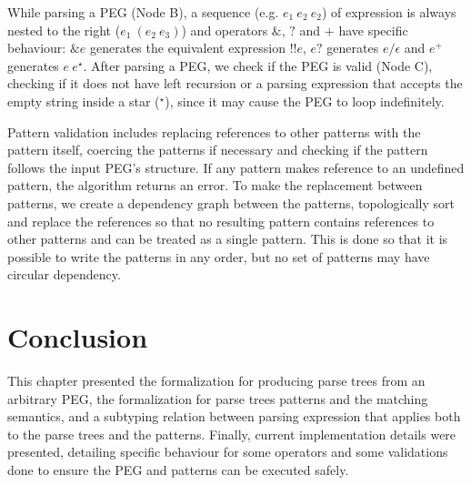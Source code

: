 While parsing a PEG (Node B), a sequence (e.g. \(e_1\:e_2\:e_2\)) of expression 
is always nested to the right (\(e_1\:(e_2\:e_3)\)) and operators \(\&\), \(?\) 
and \(+\) have specific behaviour: \(\&e\) generates the equivalent expression 
\(!!e\), \(e?\) generates \(e / \epsilon\) and \(e^+\) generates \(e \: e^\star\).
After parsing a PEG, we check if the PEG is valid (Node C), checking if it does 
not have left recursion or a parsing expression that accepts the empty string 
inside a star (\(^\star\)), since it may cause the PEG to loop indefinitely.

Pattern validation includes replacing references to other patterns with the
pattern itself, coercing the patterns if necessary and checking if the pattern 
follows the input PEG's structure. If any pattern makes reference to an undefined
pattern, the algorithm returns an error. To make the replacement between patterns, 
we create a dependency graph between the patterns, topologically sort and replace 
the references so that no resulting pattern contains references to other patterns 
and can be treated as a single pattern. This is done so that it is possible to write 
the patterns in any order, but no set of patterns may have circular dependency.

\section{Conclusion}\label{sec:methodology-conclusion}

This chapter presented the formalization for producing parse trees from an arbitrary
PEG, the formalization for parse trees patterns and the matching semantics, and 
a subtyping relation between parsing expression that applies both to the parse 
trees and the patterns. Finally, current implementation details were presented,
detailing specific behaviour for some operators and some validations done to 
ensure the PEG and patterns can be executed safely.

\cleardoublepage
